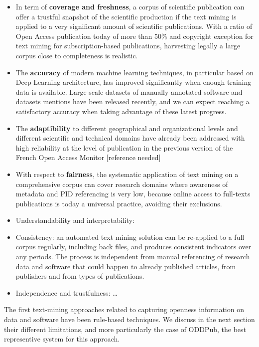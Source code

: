 \documentclass[
]{article}
\begin{document}
\begin{itemize}
\item
  In term of \textbf{coverage and freshness}, a corpus of scientific
  publication can offer a trustful snapshot of the scientific production
  if the text mining is applied to a very significant amount of
  scientific publications. With a ratio of Open Access publication today
  of more than 50\% and copyright exception for text mining for
  subscription-based publications, harvesting legally a large corpus
  close to completeness is realistic.
\item
  The \textbf{accuracy} of modern machine learning techniques, in
  particular based on Deep Learning architecture, has improved
  significantly when enough training data is available. Large scale
  datasets of manually annotated software and datasets mentions have
  been released recently, and we can expect reaching a satisfactory
  accuracy when taking advantage of these latest progress.
\item
  The \textbf{adaptibility} to different geographical and organizational
  levels and different scientific and technical domains have already
  been addressed with high reliability at the level of publication in
  the previous version of the French Open Access Monitor {[}reference
  needed{]}
\item
  With respect to \textbf{fairness}, the systematic application of text
  mining on a comprehensive corpus can cover research domains where
  awareness of metadata and PID referencing is very low, because online
  access to full-texts publications is today a universal practice,
  avoiding their exclusions.
\item
  Understandability and interpretability:
\item
  Consistency: an automated text mining solution can be re-applied to a
  full corpus regularly, including back files, and produces consistent
  indicators over any periods. The process is independent from manual
  referencing of research data and software that could happen to already
  published articles, from publishers and from types of publications.
\item
  Independence and trustfulness: \ldots{}
\end{itemize}

The first text-mining approaches related to capturing openness
information on data and software have been rule-based techniques. We
discuss in the next section their different limitations, and more
particularly the case of ODDPub, the best representive system for this
approach.
\end{document}
